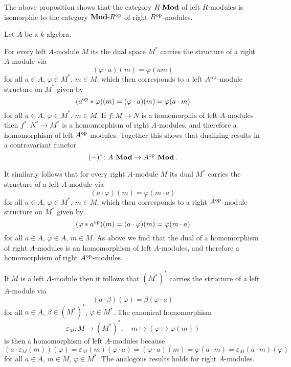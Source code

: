 

\begin{remark}
  The above proposition shows that the category $R\text{-}\mathbf{Mod}$ of left $R$-modules is isomorphic to the category $\mathbf{Mod}\text{-}R^{\operatorname{op}}$ of right $R^{\operatorname{op}}$-modules.
\end{remark}


\begin{example}
  Let $A$ be a $k$-algebra.
  
  For every left $A$-module $M$ its the dual space $M^*$ carries the structure of a right $A$-module via
  \[
      (\varphi \cdot a)(m)
    = \varphi(am)
  \]
  for all $a \in A$, $\varphi \in M^*$, $m \in M$, which then corresponds to a left $A^{\operatorname{op}}$-module structure on $M^*$ given by
  \[
      (a^{\operatorname{op}} * \varphi)(m)
    = (\varphi \cdot a)(m)
    = \varphi(a \cdot m)
  \]
  for all $a \in A$, $\varphi \in M^*$, $m \in M$.
  If $f \colon M \to N$ is a homomorphis of left $A$-modules then $f^* \colon N^* \to M^*$ is a homomorphism of right $A$-modules, and therefore a homomorphism of left $A^{\operatorname{op}}$-modules.
  Together this shows that dualizing results in a contravariant functor
  \[
            (-)^*
    \colon  A\text{-}\mathbf{Mod}
    \to     A^{\operatorname{op}}\text{-}\mathbf{Mod} \,.
  \]
  
  It similarly follows that for every right $A$-module $M$ its dual $M^*$ carries the structure of a left $A$-module via
  \[
      (a \cdot \varphi)(m)
    = \varphi(m \cdot a)
  \]
  for all $a \in A$, $\varphi \in M^*$, $m \in M$, which then corresponds to a right $A^{\operatorname{op}}$-module structure on $M^*$ given by
  \[
      (\varphi * a^{\operatorname{op}})(m)
    = (a \cdot \varphi)(m)
    = \varphi(m \cdot a)
  \]
  for all $a \in A$, $\varphi \in A$, $m \in M$.
  As above we find that the dual of a homomorphism of right $A$-modules is an homomorphism of left $A$-modules, and therefore a homomorphism of right $A^{\operatorname{op}}$-modules.
  
  If $M$ is a left $A$-module then it follows that $(M^*)^*$ carries the structure of a left $A$-module via
  \[
      (a \cdot \beta)(\varphi)
    = \beta(\varphi \cdot a)
  \]
  for all $a \in A$, $\beta \in (M^*)^*$, $\varphi \in M^*$.
  The canonical homomorphism
  \[
            \varepsilon_M
    \colon  M
    \to     (M^*)^*,
    \quad   m
    \mapsto (\varphi \mapsto \varphi(m))
  \]
  is then a homomorphism of left $A$-modules because
  \[
      (a \cdot \varepsilon_M(m))(\varphi)
    = \varepsilon_M(m)(\varphi \cdot a)
    = (\varphi \cdot a)(m)
    = \varphi(a \cdot m)
    = \varepsilon_M(a \cdot m)(\varphi)
  \]
  for all $a \in A$, $m \in M$, $\varphi \in M^*$.
  The analogous results holds for right $A$-modules.


\end{example}
